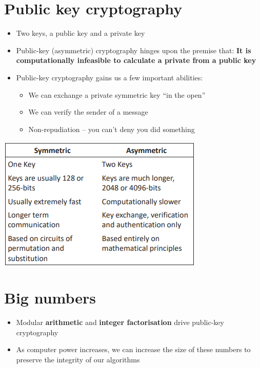 \documentclass{article}
\begin{document}
\tableofcontents

\newpage

\section{Public key cryptography}
\begin{itemize}
  \item Two keys, a public key and a private key 
  \item Public-key (asymmetric) cryptography hinges upon the premise that: \textbf{It is computationally infeasible to calculate a private from a public key}
  \item Public-key cryptography gains us a few important abilities:
  \begin{itemize}
    \item We can exchange a private symmetric key “in the open” 
    \item We can verify the sender of a message 
    \item Non-repudiation – you can’t deny you did something
  \end{itemize}
\end{itemize}
\begin{center}
  \includegraphics[scale=0.5]{sym_vs_asym_keys.png}
\end{center}

\section{Big numbers}
\begin{itemize}
  \item Modular \textbf{arithmetic} and \textbf{integer factorisation} drive public-key cryptography
  \item As computer power increases, we can increase the size of these numbers to preserve the integrity of our algorithms
\end{itemize}
\end{document}
